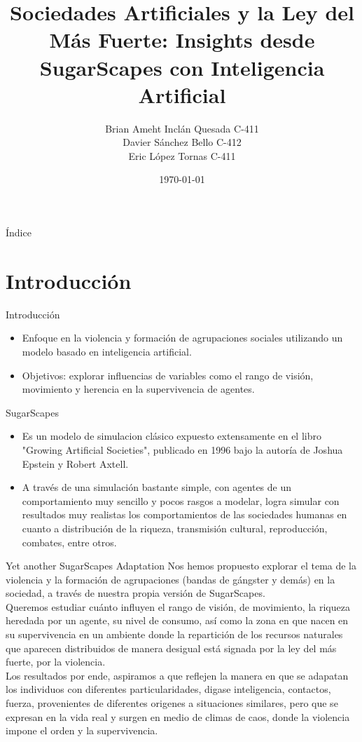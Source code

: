 \documentclass{beamer}
\title{Sociedades Artificiales y la Ley del Más Fuerte: Insights desde SugarScapes con Inteligencia Artificial}
\author{Brian Ameht Inclán Quesada C-411 \\ Davier Sánchez Bello C-412 \\ Eric López Tornas C-411}
\date{\today}
\begin{document}
\begin{frame}
  \titlepage
\end{frame}

\begin{frame}{Índice}
  \tableofcontents
\end{frame}

\section{Introducción}
\begin{frame}{Introducción}
  \begin{itemize}
    \item Enfoque en la violencia y formación de agrupaciones sociales utilizando un modelo basado en inteligencia artificial.
    \item Objetivos: explorar influencias de variables como el rango de visión, movimiento y herencia en la supervivencia de agentes.
  \end{itemize}
\end{frame}

\begin{frame}{SugarScapes}
  \begin{itemize}
    \item Es un modelo de simulacion clásico expuesto extensamente en el libro "Growing Artificial Societies", publicado en 1996 bajo la autoría de Joshua Epstein y Robert Axtell.
    \item A través de una simulación bastante simple, con agentes de un comportamiento muy sencillo y pocos rasgos a modelar, logra simular con resultados muy realistas los comportamientos de las sociedades humanas en cuanto a distribución de la riqueza, transmisión cultural, reproducción, combates, entre otros.
  \end{itemize}
\end{frame}

\begin{frame}{Yet another SugarScapes Adaptation}
  Nos hemos propuesto explorar el tema de la violencia y la formación de agrupaciones (bandas de gángster y demás) en la sociedad, a través de nuestra propia versión de SugarScapes.\\
  Queremos estudiar cuánto influyen el rango de visión, de movimiento, la riqueza heredada por un agente, su nivel de consumo, así como la zona en que nacen en su supervivencia en un ambiente donde la repartición de los recursos naturales que aparecen distribuidos de manera desigual está signada por la ley del más fuerte, por la violencia.\\
  Los resultados por ende, aspiramos a que reflejen la manera en que se adapatan los individuos con diferentes particularidades, digase inteligencia, contactos, fuerza, provenientes de diferentes origenes a situaciones similares, pero que se expresan en la vida real y surgen en medio de climas de caos, donde la violencia impone el orden y la supervivencia.\\
\end{frame}
\end{document}
